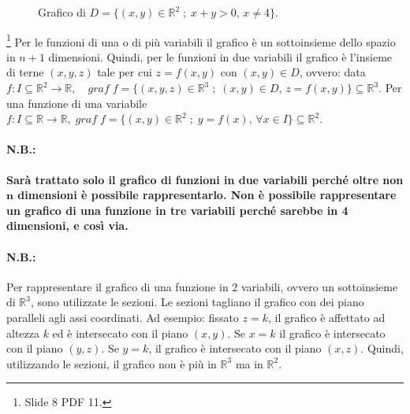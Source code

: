 \begin{example}
\begin{figure}
        \caption{Grafico di $D=\{(x,y)\in\mathbb R^2\;;\; x+y>0,\, x\neq 4\}$.}\label{fig:dominio_log(x+y)_x-4}
    \end{figure}
\end{example}

\begin{remark}\footnote{Slide 8 PDF 11.}
    Per le funzioni di una o di più variabili il grafico è un sottoinsieme dello spazio in $n+1$ dimensioni. Quindi, per le funzioni in due variabili il grafico è l'insieme di terne $(x,y,z)$ tale per cui $z=f(x,y)$ con $(x,y)\in D$, ovvero: data $f\colon I\subseteq\mathbb R^2\rightarrow\mathbb R,\quad graf\;f =\{(x,y,z)\in\mathbb R^3\;;\;(x,y)\in D,\, z=f(x,y)\}\subseteq\mathbb R^3$. Per una funzione di una variabile $f\colon I\subseteq\mathbb R\rightarrow\mathbb R,\; graf\;f =\{(x,y)\in\mathbb R^2\;;\; y=f(x),\, \forall x\in I\}\subseteq\mathbb R^2$.
\end{remark}

\paragraph{N.B.:} \textbf{Sarà trattato solo il grafico di funzioni in due variabili perché oltre non $\boldsymbol n$ dimensioni è possibile rappresentarlo. Non è possibile rappresentare un grafico di una funzione in tre variabili perché sarebbe in 4 dimensioni, e così via.}

\paragraph{N.B.:} Per rappresentare il grafico di una funzione in 2 variabili, ovvero un sottoinsieme di $\mathbb R^3$, sono utilizzate le sezioni. Le sezioni tagliano il grafico con dei piano paralleli agli assi coordinati. Ad esempio: fissato $z=k$, il grafico è affettato ad altezza $k$ ed è intersecato con il piano $(x,y)$. Se $x=k$ il grafico è intersecato con il piano $(y,z)$. Se $y=k$, il grafico è intersecato con il piano $(x,z)$. Quindi, utilizzando le sezioni, il grafico non è più in $\mathbb R^3$ ma in $\mathbb R^2$.


